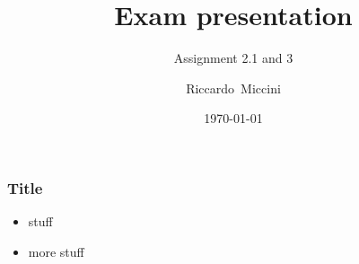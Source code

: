 \documentclass{beamer}
\title{Exam presentation}
\subtitle{Assignment 2.1 and 3}
\author[Riccardo]{Riccardo~Miccini\inst{1}}
\institute[DTU]
{
	\inst{1}
	Technical University of Denmark\\
	Digital Communication
}
\date{\today}
\begin{document}
\frame{\titlepage}

\begin{frame}
	\frametitle{Title}
	\begin{itemize}
		\item stuff
		\item more stuff
	\end{itemize}
\end{frame}
\end{document}
